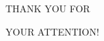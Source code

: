 \documentclass[handout]{beamer}
\begin{document}

\begin{frame}[plain]
  \headingfont

  \begin{center}
    {\huge THANK YOU FOR

      \vspace{0.3em}

      YOUR ATTENTION!}
  \end{center}
\end{frame}
\end{document}
